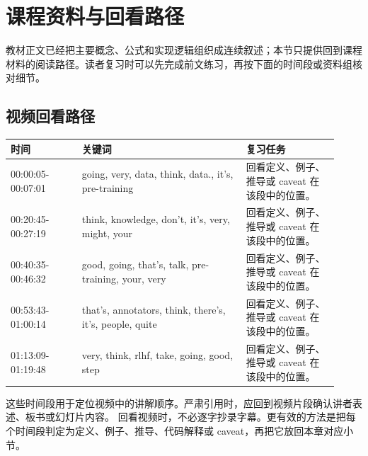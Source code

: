 \documentclass[a4paper]{article}
\begin{document}
\section{课程资料与回看路径}
教材正文已经把主要概念、公式和实现逻辑组织成连续叙述；本节只提供回到课程材料的阅读路径。读者复习时可以先完成前文练习，再按下面的时间段或资料组核对细节。
\subsection{视频回看路径}
\begin{longtable}{p{0.20\linewidth}p{0.46\linewidth}p{0.26\linewidth}}
\toprule
\textbf{时间} & \textbf{关键词} & \textbf{复习任务}\\
\midrule
00:00:05-00:07:01 & going, very, data, think, data., it's, pre-training & 回看定义、例子、推导或 caveat 在该段中的位置。\\
00:20:45-00:27:19 & think, knowledge, don't, it's, very, might, your & 回看定义、例子、推导或 caveat 在该段中的位置。\\
00:40:35-00:46:32 & good, going, that's, talk, pre-training, your, very & 回看定义、例子、推导或 caveat 在该段中的位置。\\
00:53:43-01:00:14 & that's, annotators, think, there's, it's, people, quite & 回看定义、例子、推导或 caveat 在该段中的位置。\\
01:13:09-01:19:48 & very, think, rlhf, take, going, good, step & 回看定义、例子、推导或 caveat 在该段中的位置。\\
\bottomrule
\end{longtable}
这些时间段用于定位视频中的讲解顺序。严肃引用时，应回到视频片段确认讲者表述、板书或幻灯片内容。
回看视频时，不必逐字抄录字幕。更有效的方法是把每个时间段判定为定义、例子、推导、代码解释或 caveat，再把它放回本章对应小节。
\end{document}
